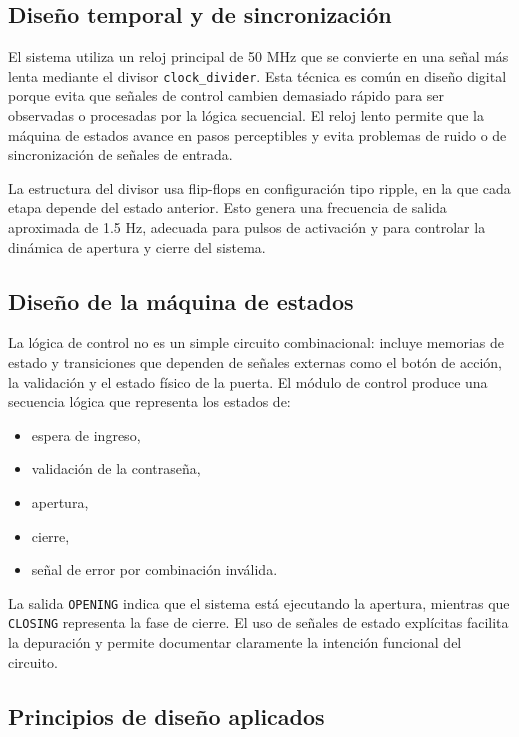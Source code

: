 \documentclass[12pt,letterpaper]{article}
\begin{document}
\subsection{Diseño temporal y de sincronización}

El sistema utiliza un reloj principal de 50 MHz que se convierte en una señal más lenta mediante el divisor \texttt{clock\_divider}. Esta técnica es común en diseño digital porque evita que señales de control cambien demasiado rápido para ser observadas o procesadas por la lógica secuencial. El reloj lento permite que la máquina de estados avance en pasos perceptibles y evita problemas de ruido o de sincronización de señales de entrada.

La estructura del divisor usa flip-flops en configuración tipo ripple, en la que cada etapa depende del estado anterior. Esto genera una frecuencia de salida aproximada de 1.5 Hz, adecuada para pulsos de activación y para controlar la dinámica de apertura y cierre del sistema.

\subsection{Diseño de la máquina de estados}

La lógica de control no es un simple circuito combinacional: incluye memorias de estado y transiciones que dependen de señales externas como el botón de acción, la validación y el estado físico de la puerta. El módulo de control produce una secuencia lógica que representa los estados de:\

\begin{itemize}[leftmargin=1.5em]
    \item espera de ingreso,
    \item validación de la contraseña,
    \item apertura,
    \item cierre,
    \item señal de error por combinación inválida.
\end{itemize}

La salida \texttt{OPENING} indica que el sistema está ejecutando la apertura, mientras que \texttt{CLOSING} representa la fase de cierre. El uso de señales de estado explícitas facilita la depuración y permite documentar claramente la intención funcional del circuito.

\subsection{Principios de diseño aplicados}
\end{document}
